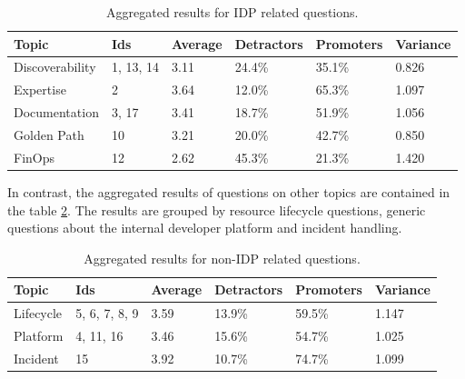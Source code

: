 \documentclass[a4paper,12pt]{article}
\begin{document}
    \begin{table}[!htbp]
        \begin{center}
            \begin{tabularx}{\textwidth}{llllll}
                \toprule
                Topic           & Ids       & Average & Detractors & Promoters & Variance \\
                \midrule
                Discoverability & 1, 13, 14 & 3.11    & 24.4\%     & 35.1\%    & 0.826    \\
                Expertise       & 2         & 3.64    & 12.0\%     & 65.3\%    & 1.097    \\
                Documentation   & 3, 17     & 3.41    & 18.7\%     & 51.9\%    & 1.056    \\
                Golden Path     & 10        & 3.21    & 20.0\%     & 42.7\%    & 0.850    \\
                FinOps          & 12        & 2.62    & 45.3\%     & 21.3\%    & 1.420    \\
                \bottomrule
            \end{tabularx}
        \end{center}
        \caption{\label{tab:aggregateidpresults} Aggregated results for IDP related questions.}
    \end{table}
    In contrast, the aggregated results of questions on other topics are contained in the table \ref{tab:nonidpresults}.
    The results are grouped by resource lifecycle questions, generic questions about the internal developer platform
    and incident handling.

    \begin{table}[!htbp]
        \begin{center}
            \begin{tabularx}{\textwidth}{llllll}
                \toprule
                Topic     & Ids           & Average & Detractors & Promoters & Variance \\
                \midrule
                Lifecycle & 5, 6, 7, 8, 9 & 3.59    & 13.9\%     & 59.5\%    & 1.147    \\
                Platform  & 4, 11, 16     & 3.46    & 15.6\%     & 54.7\%    & 1.025    \\
                Incident  & 15            & 3.92    & 10.7\%     & 74.7\%    & 1.099    \\
                \bottomrule
            \end{tabularx}
        \end{center}
        \caption{\label{tab:nonidpresults} Aggregated results for non-IDP related questions.}
    \end{table}
\end{document}
